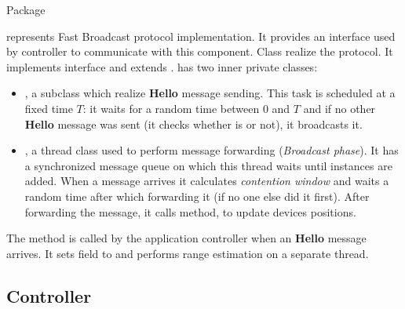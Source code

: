 Package \begin{center}\end{center} represents Fast Broadcast protocol implementation. It provides an interface  used by controller to communicate with this component. Class  realize the protocol. It implements  interface and extends .  has two inner private classes:
\begin{itemize}
	\item {}, a  subclass which realize \textbf{Hello} message sending. This task is scheduled at a fixed time $T$: it waits for a random time between $0$ and $T$ and if no other \textbf{Hello} message was sent (it checks whether  is  or not), it broadcasts it.
	\item {}, a thread class used to perform message forwarding (\textit{Broadcast phase}). It has a synchronized message queue on which this thread waits until  instances are added. When a message arrives it calculates \textit{contention window} and waits a random time after which forwarding it (if no one else did it first). After forwarding the message, it calls  method, to update devices positions.
\end{itemize} 

The method  is called by the application controller when an \textbf{Hello} message arrives. It sets  field to  and performs range estimation on a separate thread.

\subsection{Controller}

